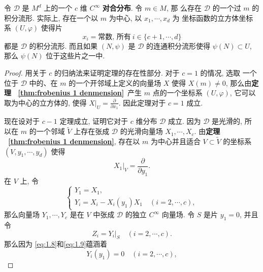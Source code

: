 \begin{thm}[Frobenius定理]\label{thm: Frobenius}
    令 $\mathscr{D}$ 是 $M^d$ 上的一个 $c$ 维 $C^{\infty}$ \textbf{对合分布}. 令 $m \in M$, 那 么存在 $\mathscr{D}$ 的一个过 $m$ 的积分流形. 实际上, 存在一个以 $m$ 为中心, 以 $x_1, \cdots, x_d$ 为 坐标函数的立方体坐标系 $(U, \varphi)$ 使得片
    \begin{equation}
        \label{eq:1.7}
        x_i= \text{常数, 所有} ~i \in\{c+1, \cdots, d\}
    \end{equation}
都是 $\mathscr{D}$ 的积分流形. 而且如果 $(N, \psi)$ 是 $\mathscr{D}$ 的连通积分流形使得 $\psi(N) \subset U$, 那么 $\psi(N)$ 位于这些片之一中.
\end{thm}
\begin{proof}
用关于 $c$ 的归纳法来证明定理的存在性部分. 对于 $c=1$ 的情况, 选取 一个位于 $\mathscr{D}$ 中的、在 $m$ 的一个开邻域上定义的向量场 $X$ 使得 $X(m) \neq 0$, 那么由\textbf{定理 ~\ref{thm:frobenius 1 denmension}}~产生 $m$ 点的一个坐标系 $(U, \varphi)$, 它可以取为中心的立方体的, 使得 $\left.X\right|_U=\frac{\partial}{\partial x_1}$. 因此定理对于 $c=1$ 成立.

现在设对于 $c-1$ 定理成立, 证明它对于 $c$ 维分布 $\mathscr{D}$ 成立. 因为 $\mathscr{D}$ 是光滑的, 所 以在 $m$ 的一个邻域 $\tilde{V}$ 上存在张成 $\mathscr{D}$ 的光滑向量场 $X_1, \cdots, X_c$. 由\textbf{定理 ~\ref{thm:frobenius 1 denmension}}, 存在以 $m$ 为中心并且适合 $V \subset \tilde{V}$ 的坐标系 $\left(V, y_1, \cdots, y_d\right)$ 使得
\begin{equation}
    \label{eq:1.8}
    \left.X_1\right|_V=\frac{\partial}{\partial y_1} .
\end{equation}
在 $V$ 上, 令
\begin{equation}
    \label{eq:x1.9}
    \left\{\begin{array}{l}
Y_1=X_1, \\
Y_i=X_i-X_i\left(y_1\right) X_1 \quad(i=2, \cdots, c),
\end{array}\right.
\end{equation}
那么向量场 $Y_1, \cdots, Y_c$ 是在 $V$ 中张成 $\mathscr{D}$ 的独立 $C^{\infty}$ 向量场. 令 $S$ 是片 $y_1=0$, 并且令
\begin{equation}\label{eq:1.10}
    Z_i=Y_i |_S\quad (i=2,\cdots,c).
\end{equation}
那么因为 \eqref{eq:1.8}和\eqref{eq:1.9}蕴涵着
\begin{equation}
    \label{eq:1.11}
    Y_i\left(y_1\right)=0 \quad(i=2, \cdots, c),
\end{equation}


\end{proof}

